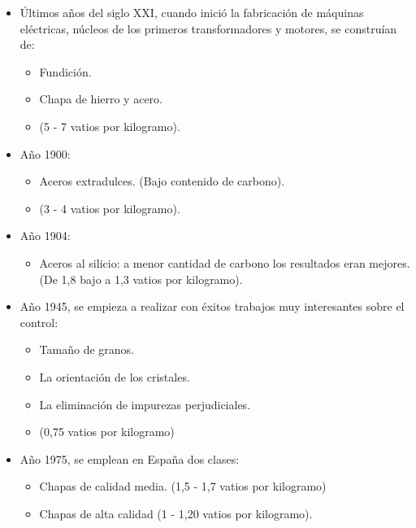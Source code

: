 \documentclass[12pt,a4paper]{article}
\begin{document}
\begin{itemize}
    \item Últimos años del siglo XXI, cuando inició  la fabricación de máquinas eléctricas, núcleos de los primeros transformadores y motores, se construían de:
    \begin{itemize}
        \item Fundición.
        \item Chapa de hierro y acero.
        \item (5 - 7 vatios por kilogramo).
    \end{itemize}
\end{itemize}
\begin{itemize}
    \item Año 1900: 
    \begin{itemize}
        \item Aceros extradulces. (Bajo contenido de carbono).
        \item (3 - 4 vatios por kilogramo).
    \end{itemize}
\end{itemize}
\begin{itemize}
    \item Año 1904:
     \begin{itemize}
        \item Aceros al silicio: a menor cantidad de carbono los resultados eran mejores.    (De 1,8 bajo a 1,3 vatios por kilogramo).
    \end{itemize}
\end{itemize}
\begin{itemize}
    \item Año 1945, se empieza a realizar con éxitos trabajos muy interesantes sobre el control: 
    \begin{itemize}
        \item Tamaño de granos.
        \item La orientación de los cristales.
        \item La eliminación de impurezas perjudiciales.
        \item (0,75 vatios por kilogramo)
    \end{itemize}
\end{itemize}
\begin{itemize}
    \item Año 1975, se emplean en España dos clases:
    \begin{itemize}
        \item Chapas de calidad media. (1,5 - 1,7 vatios por kilogramo)
        \item Chapas de alta calidad (1 - 1,20 vatios por kilogramo).
    \end{itemize}
\end{itemize}
\end{document}
